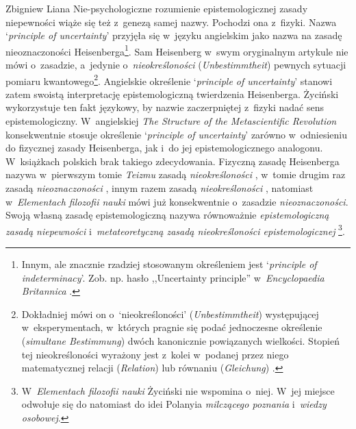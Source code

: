 \begin{artplenv}{Zbigniew Liana}
\enlargethispage{-\baselineskip}
Nie-psychologiczne rozumienie epistemologicznej zasady niepewności wiąże się też z~genezą samej nazwy. Pochodzi ona z~fizyki. Nazwa ‘\textit{principle of uncertainty}' przyjęła się w~języku angielskim jako nazwa na zasadę nieoznaczoności Heisenberga\footnote{Innym, ale znacznie rzadziej stosowanym określeniem jest ‘\textit{principle of indeterminacy}'. Zob. np. hasło ,,Uncertainty principle'' w~\textit{Encyclopaedia Britannica}
\parencite*[][]{noauthor_uncertainty_2020}.%
}. Sam Heisenberg w~swym oryginalnym artykule 
\parencite*[][s.~179nn]{heisenberg_uber_1927} %
 nie mówi o~zasadzie, a~jedynie o~\textit{nieokreśloności} (\textit{Unbestimmtheit}) pewnych sytuacji pomiaru kwantowego\footnote{Dokładniej mówi on o~‘nieokreśloności' (\textit{Unbestimmtheit}) występującej w~eksperymentach, w~których pragnie się podać jednoczesne określenie (\textit{simultane Bestimmung}) dwóch kanonicznie powiązanych wielkości. Stopień tej nieokreśloności wyrażony jest z~kolei w~podanej przez niego matematycznej relacji (\textit{Relation}) lub równaniu (\textit{Gleichung}) 
\parencite[][s.~179.181]{heisenberg_uber_1927}.%
}. Angielskie określenie ‘\textit{principle of uncertainty}' stanowi zatem swoistą interpretację epistemologiczną twierdzenia Heisenberga. Życiński wykorzystuje ten fakt językowy, by nazwie zaczerpniętej z~fizyki nadać sens epistemologiczny. W~angielskiej \textit{The Structure of the Metascientific Revolution} 
\parencite*[][]{zycinski_structure_1988} %
 konsekwentnie stosuje określenie ‘\textit{principle of uncertainty}' zarówno w~odniesieniu do fizycznej zasady Heisenberga, jak i~do jej epistemologicznego analogonu. W~książkach polskich brak takiego zdecydowania. Fizyczną zasadę Heisenberga nazywa w~pierwszym tomie \textit{Teizmu} zasadą \textit{nieokreśloności} 
\parencite[][s.~118.159]{zycinski_teizm_1985}, %
 w~tomie drugim raz zasadą \textit{nieoznaczoności} 
\parencite[][s.~24]{zycinski_teizm_1988}, %
 innym razem zasadą \textit{nieokreśloności} 
\parencite[][s.~63]{zycinski_teizm_1988}, %
 natomiast w~\textit{Elementach filozofii nauki} 
\parencites*[][]{zycinski_elementy_1996}[][]{zycinski_elementy_2015} %
 mówi już konsekwentnie o~zasadzie \textit{nieoznaczoności}. Swoją własną zasadę epistemologiczną nazywa równoważnie \textit{epistemologiczną zasadą niepewności} i~\textit{metateoretyczną zasadą nieokreśloności epistemologicznej} 
\parencite[][s.~159]{zycinski_teizm_1985}%
\footnote{W~\textit{Elementach filozofii nauki} 
\parencites*[][]{zycinski_elementy_1996}[][]{zycinski_elementy_2015} %
 Życiński nie wspomina o~niej. W~jej miejsce odwołuje się do natomiast do idei Polanyia \textit{milczącego poznania} i~\textit{wiedzy osobowej}.}.


\end{artplenv}
